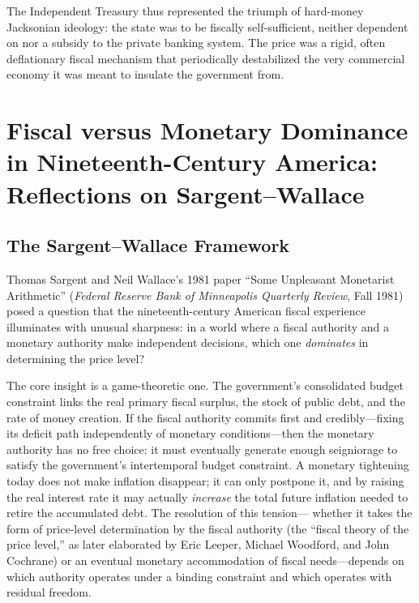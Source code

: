 \documentclass[12pt]{article}
\begin{document}
The Independent Treasury thus represented the triumph of hard-money
Jacksonian ideology: the state was to be fiscally self-sufficient,
neither dependent on nor a subsidy to the private banking system.  The
price was a rigid, often deflationary fiscal mechanism that periodically
destabilized the very commercial economy it was meant to insulate the
government from.

\section{Fiscal versus Monetary Dominance in Nineteenth-Century America:
Reflections on Sargent--Wallace}

\subsection{The Sargent--Wallace Framework}

Thomas Sargent and Neil Wallace's 1981 paper ``Some Unpleasant
Monetarist Arithmetic'' (\emph{Federal Reserve Bank of Minneapolis
Quarterly Review}, Fall 1981) posed a question that the nineteenth-century
American fiscal experience illuminates with unusual sharpness: in a
world where a fiscal authority and a monetary authority make
independent decisions, which one \emph{dominates} in determining
the price level?

The core insight is a game-theoretic one.  The government's
consolidated budget constraint links the real primary fiscal surplus,
the stock of public debt, and the rate of money creation.  If the
fiscal authority commits first and credibly---fixing its deficit
path independently of monetary conditions---then the monetary
authority has no free choice: it must eventually generate enough
seigniorage to satisfy the government's intertemporal budget
constraint.  A monetary tightening today does not make inflation
disappear; it can only postpone it, and by raising the real interest
rate it may actually \emph{increase} the total future inflation needed
to retire the accumulated debt.  The resolution of this tension---
whether it takes the form of price-level determination by the fiscal
authority (the ``fiscal theory of the price level,'' as later
elaborated by Eric Leeper, Michael Woodford, and John Cochrane) or
an eventual monetary accommodation of fiscal needs---depends on
which authority operates under a binding constraint and which
operates with residual freedom.
\end{document}
